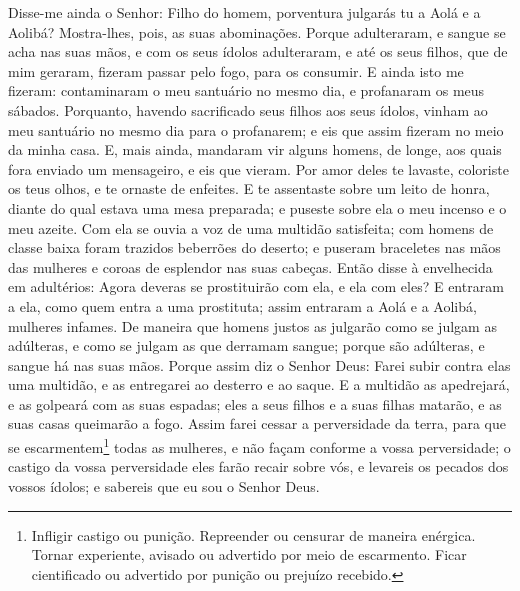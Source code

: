 Disse-me ainda o Senhor: Filho do homem, porventura julgarás tu a
Aolá e a Aolibá? Mostra-lhes, pois, as suas abominações.
Porque adulteraram, e sangue se acha nas suas mãos, e com os
seus ídolos adulteraram, e até os seus filhos, que de mim geraram,
fizeram passar pelo fogo, para os consumir. E ainda isto me
fizeram: contaminaram o meu santuário no mesmo dia, e profanaram os
meus sábados. Porquanto, havendo sacrificado seus filhos aos
seus ídolos, vinham ao meu santuário no mesmo dia para o profanarem;
e eis que assim fizeram no meio da minha casa. E, mais ainda,
mandaram vir alguns homens, de longe, aos quais fora enviado um
mensageiro, e eis que vieram. Por amor deles te lavaste, coloriste
os teus olhos, e te ornaste de enfeites. E te assentaste
sobre um leito de honra, diante do qual estava uma mesa preparada; e
puseste sobre ela o meu incenso e o meu azeite. Com ela se
ouvia a voz de uma multidão satisfeita; com homens de classe baixa
foram trazidos beberrões do deserto; e puseram braceletes nas mãos
das mulheres e coroas de esplendor nas suas cabeças. Então
disse à envelhecida em adultérios: Agora deveras se prostituirão com
ela, e ela com eles? E entraram a ela, como quem entra a uma
prostituta; assim entraram a Aolá e a Aolibá, mulheres infames.
De maneira que homens justos as julgarão como se julgam as
adúlteras, e como se julgam as que derramam sangue; porque são
adúlteras, e sangue há nas suas mãos. Porque assim diz o
Senhor Deus: Farei subir contra elas uma multidão, e as entregarei
ao desterro e ao saque. E a multidão as apedrejará, e as
golpeará com as suas espadas; eles a seus filhos e a suas filhas
matarão, e as suas casas queimarão a fogo. Assim farei cessar
a perversidade da terra, para que se escarmentem\footnote{Infligir
castigo ou punição. Repreender ou censurar de maneira enérgica.
Tornar experiente, avisado ou advertido por meio de escarmento.
Ficar cientificado ou advertido por punição ou prejuízo recebido.}
todas as mulheres, e não façam conforme a vossa perversidade;
o castigo da vossa perversidade eles farão recair sobre vós,
e levareis os pecados dos vossos ídolos; e sabereis que eu sou o
Senhor Deus.

\medskip

